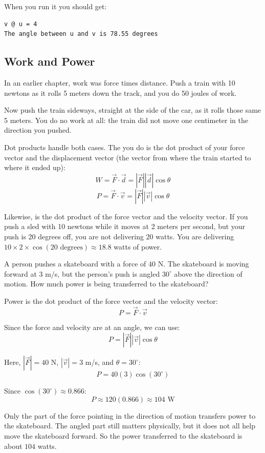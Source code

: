 When you run it you should get:
\begin{verbatim}
v @ u = 4
The angle between u and v is 78.55 degrees
\end{verbatim}

\subsection{Work and Power}
In an earlier chapter, work was force times distance. Push a train with 10
newtons as it rolls 5 meters down the track, and you do 50 joules of work.

Now push the train sideways, straight at the side of the car, as it rolls
those same 5 meters. You do no work at all: the train did not move one
centimeter in the direction you pushed.


Dot products handle both cases. The  you do is the dot product of your force vector and the
displacement vector (the vector from where the train started to where it
ended up):
$$W = \vec{F} \cdot \vec{d} = |\vec{F}| |\vec{d}| \cos\theta$$
$$P = \vec{F} \cdot \vec{v} = |\vec{F}| |\vec{v}| \cos\theta$$

Likewise,  is the dot product of the force
vector and the velocity vector. If you push a sled with 10 newtons while it
moves at 2 meters per second, but your push is 20 degrees off, you are not
delivering 20 watts. You are delivering $10 \times 2 \times \cos(20 \text{ degrees}) \approx 18.8$ watts of power.

\begin{Exercise}[title={Power at an angle}, label=power_angle]
A person pushes a skateboard with a force of $40$ N. The skateboard is moving forward at
$3$ m/s, but the person's push is angled $30^\circ$ above the direction of motion.
How much power is being transferred to the skateboard?
\end{Exercise}

\begin{Answer}[ref=power_angle]
Power is the dot product of the force vector and the velocity vector:
\[
P = \vec{F} \cdot \vec{v}
\]

Since the force and velocity are at an angle, we can use:
\[
P = |\vec{F}| |\vec{v}| \cos\theta
\]

Here, $|\vec{F}| = 40$ N, $|\vec{v}| = 3$ m/s, and $\theta = 30^\circ$:
\[
P = 40(3)\cos(30^\circ)
\]

Since $\cos(30^\circ) \approx 0.866$:
\[
P \approx 120(0.866) \approx 104 \text{ W}
\]

Only the part of the force pointing in the direction of motion transfers power
to the skateboard. The angled part still matters physically, but it does not all help
move the skateboard forward. So the power transferred to the skateboard is about $104$ watts.
\end{Answer}

